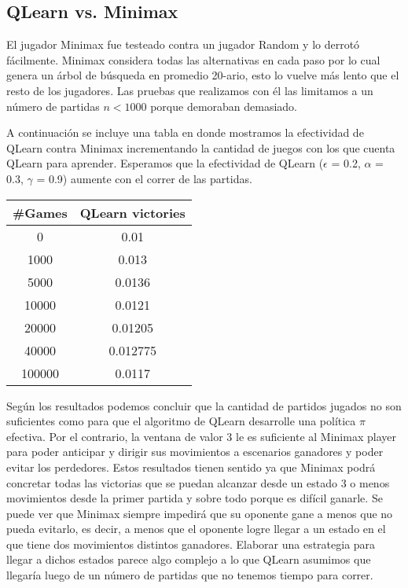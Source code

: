 \subsection{QLearn vs. Minimax}

El jugador Minimax fue testeado contra un jugador Random y lo derrotó
fácilmente. Minimax considera todas las alternativas en cada paso por lo cual
genera un árbol de búsqueda en promedio 20-ario, esto lo vuelve más lento que el
resto de los jugadores. Las pruebas que realizamos con él las limitamos a un
número de partidas $n < 1000$ porque demoraban demasiado.

A continuación se incluye una tabla en donde mostramos la efectividad de QLearn contra
Minimax incrementando la cantidad de juegos con los que cuenta QLearn para
aprender. Esperamos que la efectividad de QLearn ($\epsilon$ = 0.2, $\alpha$ =
0.3, $\gamma$ = 0.9) aumente con el correr de las partidas.

\begin{center}
\begin{tabular}{c c}
	\toprule
	\textbf{\#Games} & \textbf{QLearn victories} \\
	\midrule
	0 & 0.01 \\
	1000 & 0.013 \\
	5000 & 0.0136 \\
	10000 & 0.0121 \\
	20000 & 0.01205 \\
	40000 & 0.012775 \\
	100000 & 0.0117 \\
	\bottomrule
\end{tabular}
\end{center}

Según los resultados podemos concluir que la cantidad de partidos jugados no son suficientes como para que el
algoritmo de QLearn desarrolle una política $\pi$ efectiva. Por el contrario, la ventana de valor 3
le es suficiente al Minimax player para poder anticipar y dirigir sus movimientos a escenarios ganadores y poder
evitar los perdedores.
Estos resultados tienen sentido ya que Minimax podrá concretar todas las
victorias que se puedan alcanzar desde un estado 3 o menos movimientos desde la
primer partida y sobre todo porque es difícil ganarle. Se puede ver que Minimax
siempre impedirá que su oponente gane a menos que no pueda evitarlo, es decir, a
menos que el oponente logre llegar a un estado en el que tiene dos movimientos
distintos ganadores. Elaborar una estrategia para llegar a dichos estados parece
algo complejo a lo que QLearn asumimos que llegaría luego de un número de
partidas que no tenemos tiempo para correr.
